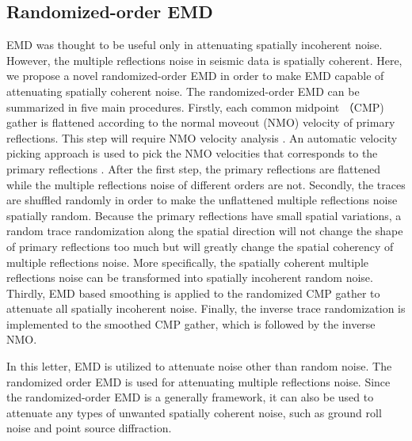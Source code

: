 \subsection{Randomized-order EMD}
EMD was thought to be useful only in attenuating spatially incoherent noise. However, the multiple reflections noise in seismic data is spatially coherent. Here, we propose a novel randomized-order EMD in order to make EMD capable of attenuating spatially coherent noise. The randomized-order EMD can be summarized in five main procedures. Firstly, each common midpoint （CMP) gather is flattened according to the normal moveout (NMO) velocity of primary reflections. This step will require NMO velocity analysis \cite{yangkang2015vel,shuwei2016vscan}. An automatic velocity picking approach is used to pick the NMO velocities that corresponds to the primary reflections \cite{fomel20091}. After the first step, the primary reflections are flattened while the multiple reflections noise of different orders are not. Secondly, the traces are shuffled randomly in order to make the unflattened multiple reflections noise spatially random. Because the primary reflections have small spatial variations, a random trace randomization along the spatial direction will not change the shape of primary reflections too much but will greatly change the spatial coherency of multiple reflections noise. More specifically, the spatially coherent multiple reflections noise can be transformed into spatially incoherent random noise. Thirdly, EMD based smoothing is applied to the randomized CMP gather to attenuate all spatially incoherent noise. Finally, the inverse trace randomization is implemented to the smoothed CMP gather, which is followed by the inverse NMO.  

In this letter, EMD is utilized to attenuate noise other than random noise. The randomized order EMD is used for attenuating multiple reflections noise. Since the randomized-order EMD is a generally framework, it can also be used to attenuate any types of unwanted spatially coherent noise, such as ground roll noise \cite{yangkang2015orthogroll} and point source diffraction.

